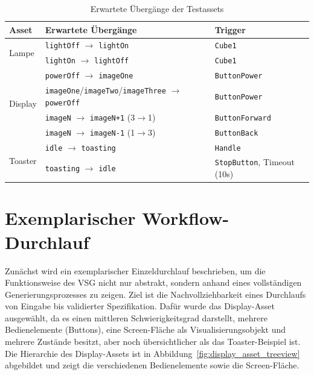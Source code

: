 \begin{table}[H]
  \centering
  \begin{tabularx}{\linewidth}{lXl}
    \toprule
    Asset                    & Erwartete Übergänge                                                                     & Trigger                            \\
    \midrule
    \multirow{2}{*}{Lampe}   & \texttt{lightOff} $\rightarrow$ \texttt{lightOn}                                        & \texttt{Cube1}                     \\
                             & \texttt{lightOn} $\rightarrow$ \texttt{lightOff}                                        & \texttt{Cube1}                     \\
    \midrule
    \multirow{4}{*}{Display} & \texttt{powerOff} $\rightarrow$ \texttt{imageOne}                                       & \texttt{ButtonPower}               \\
                             & \texttt{imageOne}/\texttt{imageTwo}/\texttt{imageThree} $\rightarrow$ \texttt{powerOff} & \texttt{ButtonPower}               \\
                             & \texttt{imageN} $\rightarrow$ \texttt{imageN+1} (3$\rightarrow$1)                       & \texttt{ButtonForward}             \\
                             & \texttt{imageN} $\rightarrow$ \texttt{imageN-1} (1$\rightarrow$3)                       & \texttt{ButtonBack}                \\
    \midrule
    \multirow{2}{*}{Toaster} & \texttt{idle} $\rightarrow$ \texttt{toasting}                                           & \texttt{Handle}                    \\
                             & \texttt{toasting} $\rightarrow$ \texttt{idle}                                           & \texttt{StopButton}, Timeout (10s) \\
    \bottomrule
  \end{tabularx}
  \caption{Erwartete Übergänge der Testassets}\label{tab:testassets_übergänge}
\end{table}

\pagebreak
\section{Exemplarischer Workflow-Durchlauf}\label{sec:exemplarischer_workflow_durchlauf}

Zunächst wird ein exemplarischer Einzeldurchlauf beschrieben, um die Funktionsweise des VSG nicht nur abstrakt, sondern anhand eines vollständigen Generierungsprozesses zu zeigen. Ziel ist die Nachvollziehbarkeit eines Durchlaufs von Eingabe bis validierter Spezifikation. Dafür wurde das Display-Asset ausgewählt, da es einen mittleren Schwierigkeitsgrad darstellt, mehrere Bedienelemente (Buttons), eine Screen-Fläche als Visualisierungsobjekt und mehrere Zustände besitzt, aber noch übersichtlicher als das Toaster-Beispiel ist. Die Hierarchie des Display-Assets ist in Abbildung~\ref{fig:display_asset_treeview} abgebildet und zeigt die verschiedenen Bedienelemente sowie die Screen-Fläche.

